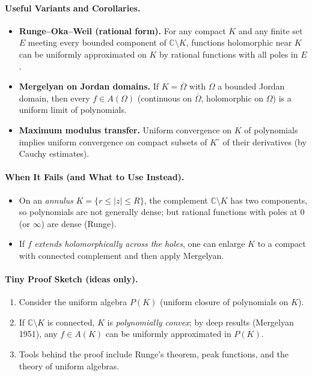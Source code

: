 \documentclass[12pt,a4paper]{article}
\theoremstyle{plain}
\theoremstyle{definition}
\theoremstyle{remark}
\theoremstyle{remark}
\begin{document}
\paragraph{Useful Variants and Corollaries.}
\begin{itemize}
	\item \textbf{Runge--Oka--Weil (rational form).}
	For any compact $K$ and any finite set $E$ meeting every bounded component
	of $\mathbb{C}\setminus K$, functions holomorphic near $K$ can be uniformly approximated
	on $K$ by rational functions with all poles in $E$.
	\item \textbf{Mergelyan on Jordan domains.}
	If $K=\overline{\Omega}$ with $\Omega$ a bounded Jordan domain,
	then every $f\in A(\Omega)$ (continuous on $\overline{\Omega}$, holomorphic on $\Omega$)
	is a uniform limit of polynomials.
	\item \textbf{Maximum modulus transfer.}
	Uniform convergence on $K$ of polynomials implies uniform convergence
	on compact subsets of $K^\circ$ of their derivatives (by Cauchy estimates).
\end{itemize}

\paragraph{When It Fails (and What to Use Instead).}
\begin{itemize}
	\item On an \emph{annulus} $K=\{r\le |z|\le R\}$,
	the complement $\mathbb{C}\setminus K$ has two components,
	so polynomials are not generally dense; but rational functions with poles at $0$ (or $\infty$)
	are dense (Runge).
	\item If $f$ \emph{extends holomorphically across the holes},
	one can enlarge $K$ to a compact with connected complement and then apply Mergelyan.
\end{itemize}

\paragraph{Tiny Proof Sketch (ideas only).}
\begin{enumerate}[label=(\alph*), leftmargin=*]
	\item Consider the uniform algebra $P(K)$ (uniform closure of polynomials on $K$).
	\item If $\mathbb{C}\setminus K$ is connected, $K$ is \emph{polynomially convex};
	by deep results (Mergelyan 1951), any $f\in A(K)$ can be uniformly approximated in $P(K)$.
	\item Tools behind the proof include Runge’s theorem, peak functions,
	and the theory of uniform algebras.
\end{enumerate}
\end{document}
